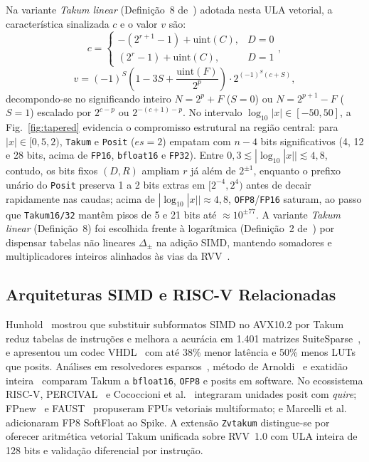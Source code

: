 \documentclass[conference]{IEEEtran}
\begin{document}
Na variante \emph{Takum linear} (Defini\c{c}\~ao~8 de~\cite{hunhold2024takum}) adotada nesta ULA vetorial, a caracter\'istica sinalizada $c$ e o valor $v$ s\~ao:
\begin{equation}
    c = \begin{cases} -(2^{r+1}-1) + \mathrm{uint}(C), & D = 0 \\ (2^r - 1) + \mathrm{uint}(C), & D = 1 \end{cases},
\end{equation}
\begin{equation}
    v = (-1)^S \left(1 - 3S + \frac{\mathrm{uint}(F)}{2^p}\right) \cdot 2^{(-1)^S (c + S)},
\end{equation}
decompondo-se no significando inteiro $N = 2^p + F$ ($S=0$) ou $N = 2^{p+1} - F$ ($S=1$) escalado por $2^{c-p}$ ou $2^{-(c+1)-p}$. No intervalo $\log_{10}|x|\in[-50,50]$, a Fig.~\ref{fig:tapered} evidencia o compromisso estrutural na regi\~ao central: para $|x|\in[0{,}5,2)$, \texttt{Takum} e \texttt{Posit} ($es=2$) empatam com $n-4$ bits significativos (4, 12 e 28 bits, acima de \texttt{FP16}, \texttt{bfloat16} e \texttt{FP32}). Entre $0{,}3\lesssim|\log_{10}|x||\lesssim 4{,}8$, contudo, os bits fixos $(D,R)$ ampliam $r$ j\'a al\'em de $2^{\pm 1}$, enquanto o prefixo un\'ario do \texttt{Posit} preserva 1 a 2 bits extras em $[2^{-4},2^4)$ antes de decair rapidamente nas caudas; acima de $|\log_{10}|x||\approx 4{,}8$, \texttt{OFP8}/\texttt{FP16} saturam, ao passo que \texttt{Takum16/32} mant\^em pisos de 5 e 21 bits at\'e $\approx 10^{\pm 77}$. A variante \emph{Takum linear} (Defini\c{c}\~ao~8) foi escolhida frente \`a logar\'itmica (Defini\c{c}\~ao~2 de~\cite{hunhold2024takum}) por dispensar tabelas n\~ao lineares $\Delta_\pm$ na adi\c{c}\~ao SIMD, mantendo somadores e multiplicadores inteiros alinhados \`as vias da RVV~\cite{hunhold2025avx102}.

\subsection{Arquiteturas SIMD e RISC-V Relacionadas}
Hunhold~\cite{hunhold2025avx102} mostrou que substituir subformatos SIMD no AVX10.2 por Takum reduz tabelas de instru\c{c}\~oes e melhora a acur\'acia em 1.401 matrizes SuiteSparse~\cite{davis2011suitesparse,mufolab}, e apresentou um codec VHDL~\cite{hunhold2024vhdl} com at\'e 38\% menor lat\^encia e 50\% menos LUTs que posits. An\'alises em resolvedores esparsos~\cite{hunhold2025solvers}, m\'etodo de Arnoldi~\cite{hunhold2025arnoldi} e exatid\~ao inteira~\cite{hunhold2025integers} comparam Takum a \texttt{bfloat16}, \texttt{OFP8} e posits em software. No ecossistema RISC-V, PERCIVAL~\cite{mallasen2022percival} e Cococcioni et al.~\cite{cococcioni2021vectorizing} integraram unidades posit com \emph{quire}; FPnew~\cite{mach2020fpnew} e FAUST~\cite{kovac2023faust} propuseram FPUs vetoriais multiformato; e Marcelli et al.~\cite{marcelli2025fp8spike} adicionaram FP8 SoftFloat ao Spike. A extens\~ao \texttt{Zvtakum} distingue-se por oferecer aritm\'etica vetorial Takum unificada sobre RVV~1.0 com ULA inteira de 128 bits e valida\c{c}\~ao diferencial por instru\c{c}\~ao.
\end{document}
